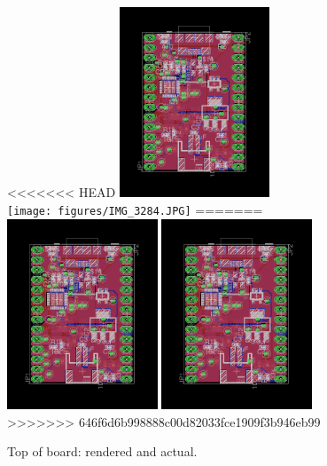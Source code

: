 \documentclass[11pt,oneside]{amsart}
\begin{document}
\begin{figure}[htbp]
\begin{center}
<<<<<<< HEAD
\includegraphics[width=0.4\textwidth]{figures/board.png}\\
\texttt{[image: figures/IMG\_3284.JPG]}
=======
\includegraphics[width=0.4\textwidth]{figures/board.png}
\includegraphics[width=0.4\textwidth]{figures/board.png}
>>>>>>> 646f6d6b998888c00d82033fce1909f3b946eb99
\caption{Top of board: rendered and actual.}
\label{fig:board}
\end{center}
\end{figure}
\end{document}
